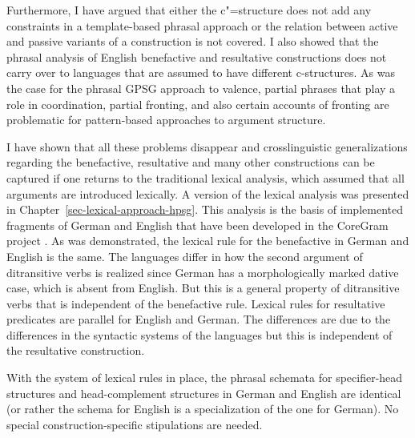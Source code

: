 Furthermore, I have argued that either the c"=structure does not add any constraints in a
template-based phrasal approach or the relation between active and passive variants of a construction
is not covered. I also showed that the phrasal analysis of English benefactive and resultative
constructions does not carry over to languages that are assumed to have different c-structures. As
was the case for the phrasal GPSG approach to valence, partial phrases that play a role in
coordination, partial fronting, and also certain accounts of fronting are problematic for
pattern-based approaches to argument structure. 

I have shown that all these problems disappear and crosslinguistic generalizations regarding the
benefactive, resultative and many other constructions can be captured if one returns
to the traditional lexical analysis, which assumed that all arguments are introduced lexically. A
version of the lexical analysis was presented in Chapter~\ref{sec-lexical-approach-hpsg}. This analysis is the basis of
implemented fragments of German and English that have been developed in the CoreGram project
\citep{MuellerGrammix,MuellerCoreGram}. As was demonstrated, the lexical rule for the benefactive in
German and English is the same. The languages differ in how the second argument of ditransitive
verbs is realized since German has a morphologically marked dative case, which is absent from
English. But this is a general property of ditransitive verbs that is independent of the benefactive
rule. Lexical rules for resultative predicates are parallel for English and German. The differences
are due to the differences in the syntactic systems of the languages but this is independent of the
resultative construction.

With the system of lexical rules in place, the phrasal schemata for specifier-head structures
and head-complement structures in German and English are identical (or rather the schema for English
is a specialization of the one for German). No special construction-specific
stipulations are needed.

